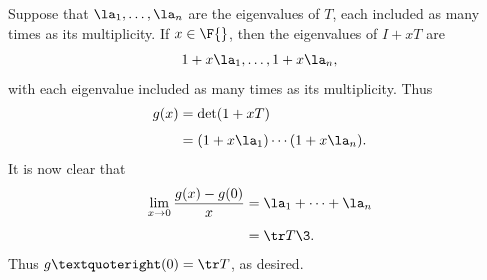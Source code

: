 \begin{Solution}
Suppose that $\la_1, \ldots, \la_n$ are the eigenvalues of $T$, each included as many times as its multiplicity. If $x \in \F{}$, then the eigenvalues of $I + x T$ are
\[
1 + x \la_1, \ldots, 1 + x \la_n,
\]
with each eigenvalue included as many times as its multiplicity. Thus
\begin{align*}
g(x) &= \det(1 + x T) \\[4bp]
&= (1 + x \la_1) \cdots (1 + x \la_n).
\end{align*}
It is now clear that
\begin{align*}
\lim_{x \to 0} \frac{ g(x) - g(0)}{x} &= \la_1 + \dots + \la_n\\[4bp]
&= \tr T\3.
\end{align*}
Thus $g’(0) = \tr T$, as desired.
\end{Solution}

